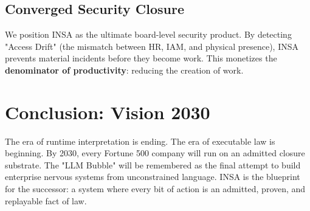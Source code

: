 \documentclass[12pt,a4paper,oneside]{book}
\begin{document}
\section{Converged Security Closure}
We position INSA as the ultimate board-level security product. By detecting "Access Drift" (the mismatch between HR, IAM, and physical presence), INSA prevents material incidents before they become work. This monetizes the \textbf{denominator of productivity}: reducing the creation of work.

\chapter{Conclusion: Vision 2030}

The era of runtime interpretation is ending. The era of executable law is beginning. By 2030, every Fortune 500 company will run on an admitted closure substrate. The "LLM Bubble" will be remembered as the final attempt to build enterprise nervous systems from unconstrained language. INSA is the blueprint for the successor: a system where every bit of action is an admitted, proven, and replayable fact of law.
\end{document}

